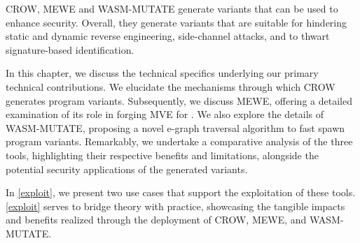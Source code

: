 \begin{tcolorbox}[title=Takeaway,boxrule=1pt,arc=.2em,boxsep=1.0mm]
    CROW, MEWE and WASM-MUTATE generate \Wasm variants that can be used to enhance security. 
    Overall, they generate variants that are suitable for hindering static and dynamic reverse engineering, side-channel attacks, and to thwart signature-based identification. 
\end{tcolorbox}



In this chapter, we discuss the technical specifics underlying our primary technical contributions.
We elucidate the mechanisms through which CROW generates program variants.
Subsequently, we discuss MEWE, offering a detailed examination of its role in forging MVE for \Wasm. 
We also explore the details of WASM-MUTATE, proposing a novel e-graph traversal algorithm to fast spawn \wasm program variants. 
Remarkably, we undertake a comparative analysis of the three tools, highlighting their respective benefits and limitations, alongside the potential security applications of the generated \wasm variants. 

In \autoref{exploit}, we present two use cases that support the exploitation of these tools.
\autoref{exploit} serves to bridge theory with practice, showcasing the tangible impacts and benefits realized through the deployment of CROW, MEWE, and WASM-MUTATE.
